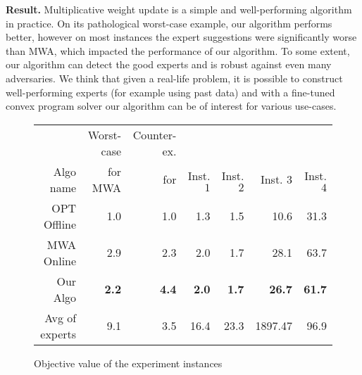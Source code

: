 \textbf{Result.} Multiplicative weight update is a simple and well-performing algorithm in practice. On its pathological worst-case example, our algorithm performs better, however on most instances the expert suggestions were significantly worse than MWA, which impacted the performance of our algorithm. To some extent, our algorithm can detect the good experts and is robust against even many adversaries. We think that given a real-life problem, it is possible to construct well-performing experts (for example using past data) and with a fine-tuned convex program solver our algorithm can be of interest for various use-cases.

\begin{figure}[!ht]
\centering
\begin{tabular}{r|r|r|r|r|r|r}
          & Worst-case & Counter-ex. & & & & \\
Algo name & for MWA  & for \cite{AnandGe22:Online-Algorithms} & Inst. $1$ & Inst. $2$ & Inst. $3$ & Inst. $4$\\
\hline
OPT Offline            & 1.0 & 1.0 & 1.3 & 1.5 & 10.6 & 31.3 \\
MWA Online             & 2.9 & 2.3 & 2.0 & 1.7 & 28.1 & 63.7 \\
\hline
Our Algo           & {\bf 2.2} & {\bf 4.4} & {\bf 2.0} & {\bf 1.7} & {\bf 26.7}  & {\bf 61.7} \\
\hline
Avg of experts      & 9.1 & 3.5 & 16.4 & 23.3 & 1897.47 & 96.9 \\
\end{tabular}
\caption{Objective value of the experiment instances}
\label{fig:exp-objective}
\end{figure}

